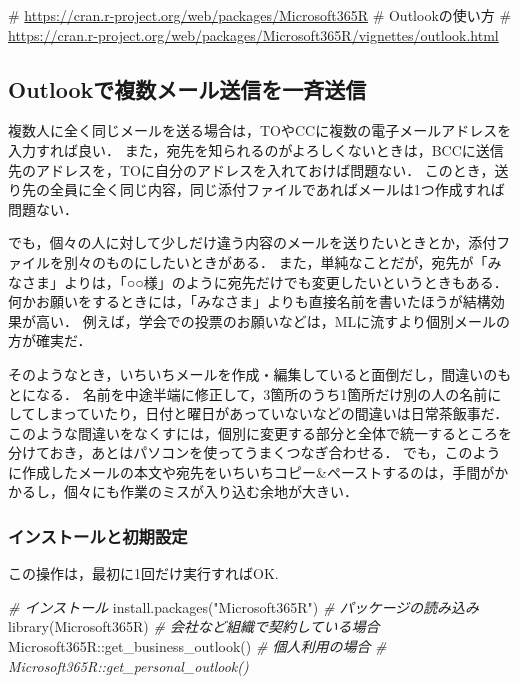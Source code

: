 \documentclass[
]{article}
\newenvironment{Shaded}{\begin{snugshade}}{\end{snugshade}}
\newcommand{\CommentTok}[1]{\textcolor[rgb]{0.56,0.35,0.01}{\textit{#1}}}
\newcommand{\FunctionTok}[1]{\textcolor[rgb]{0.00,0.00,0.00}{#1}}
\newcommand{\NormalTok}[1]{#1}
\newcommand{\SpecialCharTok}[1]{\textcolor[rgb]{0.00,0.00,0.00}{#1}}
\newcommand{\StringTok}[1]{\textcolor[rgb]{0.31,0.60,0.02}{#1}}
\begin{document}
\# \url{https://cran.r-project.org/web/packages/Microsoft365R}
\# Outlookの使い方
\# \url{https://cran.r-project.org/web/packages/Microsoft365R/vignettes/outlook.html}

\hypertarget{outlookux3067ux8907ux6570ux30e1ux30fcux30ebux9001ux4fe1ux3092ux4e00ux6589ux9001ux4fe1}{%
\subsection{Outlookで複数メール送信を一斉送信}\label{outlookux3067ux8907ux6570ux30e1ux30fcux30ebux9001ux4fe1ux3092ux4e00ux6589ux9001ux4fe1}}

複数人に全く同じメールを送る場合は，TOやCCに複数の電子メールアドレスを入力すれば良い．
また，宛先を知られるのがよろしくないときは，BCCに送信先のアドレスを，TOに自分のアドレスを入れておけば問題ない．
このとき，送り先の全員に全く同じ内容，同じ添付ファイルであればメールは1つ作成すれば問題ない．

でも，個々の人に対して少しだけ違う内容のメールを送りたいときとか，添付ファイルを別々のものにしたいときがある．
また，単純なことだが，宛先が「みなさま」よりは，「○○様」のように宛先だけでも変更したいというときもある．
何かお願いをするときには，「みなさま」よりも直接名前を書いたほうが結構効果が高い．
例えば，学会での投票のお願いなどは，MLに流すより個別メールの方が確実だ．

そのようなとき，いちいちメールを作成・編集していると面倒だし，間違いのもとになる．
名前を中途半端に修正して，3箇所のうち1箇所だけ別の人の名前にしてしまっていたり，日付と曜日があっていないなどの間違いは日常茶飯事だ．
このような間違いをなくすには，個別に変更する部分と全体で統一するところを分けておき，あとはパソコンを使ってうまくつなぎ合わせる．
でも，このように作成したメールの本文や宛先をいちいちコピー\&ペーストするのは，手間がかかるし，個々にも作業のミスが入り込む余地が大きい．

\hypertarget{ux30a4ux30f3ux30b9ux30c8ux30fcux30ebux3068ux521dux671fux8a2dux5b9a}{%
\subsubsection{インストールと初期設定}\label{ux30a4ux30f3ux30b9ux30c8ux30fcux30ebux3068ux521dux671fux8a2dux5b9a}}

この操作は，最初に1回だけ実行すればOK.

\begin{Shaded}
\begin{Highlighting}[]
  \CommentTok{\# インストール}
\FunctionTok{install.packages}\NormalTok{(}\StringTok{"Microsoft365R"}\NormalTok{)}
  \CommentTok{\# パッケージの読み込み}
\FunctionTok{library}\NormalTok{(Microsoft365R)}
 \CommentTok{\# 会社など組織で契約している場合}
\NormalTok{Microsoft365R}\SpecialCharTok{::}\FunctionTok{get\_business\_outlook}\NormalTok{()}
 \CommentTok{\# 個人利用の場合}
  \CommentTok{\# Microsoft365R::get\_personal\_outlook()}
\end{Highlighting}
\end{Shaded}
\end{document}
